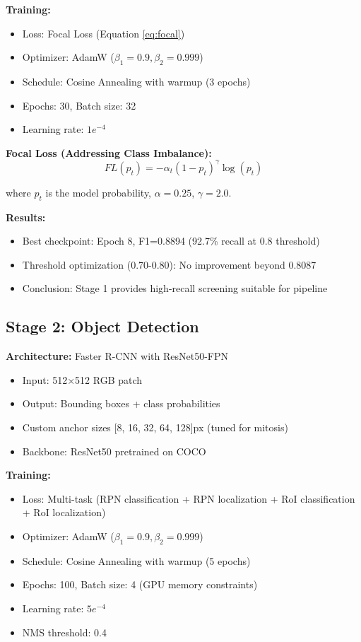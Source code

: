 \documentclass[11pt,a4paper]{article}
\begin{document}
\textbf{Training:}
\begin{itemize}
    \item Loss: Focal Loss (Equation \ref{eq:focal})
    \item Optimizer: AdamW ($\beta_1=0.9, \beta_2=0.999$)
    \item Schedule: Cosine Annealing with warmup (3 epochs)
    \item Epochs: 30, Batch size: 32
    \item Learning rate: $1e^{-4}$
\end{itemize}

\textbf{Focal Loss (Addressing Class Imbalance):}
\begin{equation}
\label{eq:focal}
FL(p_t) = -\alpha_t (1 - p_t)^{\gamma} \log(p_t)
\end{equation}

where $p_t$ is the model probability, $\alpha=0.25$, $\gamma=2.0$.

\textbf{Results:}
\begin{itemize}
    \item Best checkpoint: Epoch 8, F1=0.8894 (92.7\% recall at 0.8 threshold)
    \item Threshold optimization (0.70-0.80): No improvement beyond 0.8087
    \item Conclusion: Stage 1 provides high-recall screening suitable for pipeline
\end{itemize}

\subsection{Stage 2: Object Detection}

\textbf{Architecture:} Faster R-CNN with ResNet50-FPN
\begin{itemize}
    \item Input: 512×512 RGB patch
    \item Output: Bounding boxes + class probabilities
    \item Custom anchor sizes [8, 16, 32, 64, 128]px (tuned for mitosis)
    \item Backbone: ResNet50 pretrained on COCO
\end{itemize}

\textbf{Training:}
\begin{itemize}
    \item Loss: Multi-task (RPN classification + RPN localization + RoI classification 
          + RoI localization)
    \item Optimizer: AdamW ($\beta_1=0.9, \beta_2=0.999$)
    \item Schedule: Cosine Annealing with warmup (5 epochs)
    \item Epochs: 100, Batch size: 4 (GPU memory constraints)
    \item Learning rate: $5e^{-4}$
    \item NMS threshold: 0.4
\end{itemize}
\end{document}
